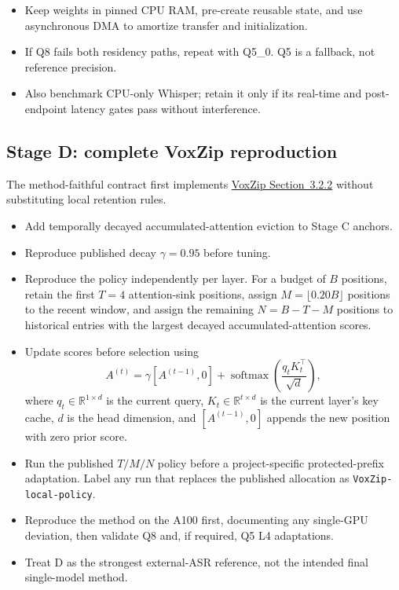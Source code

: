 \documentclass[10pt,letterpaper]{article}
\newcommand{\code}[1]{\texttt{#1}}
\begin{document}
\begin{itemize}
    \item Keep weights in pinned CPU RAM, pre-create reusable state, and use asynchronous DMA to amortize transfer and initialization.
    \item If Q8 fails both residency paths, repeat with Q5\_0. Q5 is a fallback, not reference precision.
    \item Also benchmark CPU-only Whisper; retain it only if its real-time and post-endpoint latency gates pass without interference.
\end{itemize}

\subsection{Stage D: complete VoxZip reproduction}
The method-faithful contract first implements
\href{https://arxiv.org/html/2608.08569#S3.SS2.SSS2}{VoxZip Section~3.2.2}
without substituting local retention rules.
\begin{itemize}
    \item Add temporally decayed accumulated-attention eviction to Stage C anchors.
    \item Reproduce published decay $\gamma=0.95$ before tuning.
    \item Reproduce the policy independently per layer. For a budget of $B$ positions, retain the first $T=4$ attention-sink positions, assign $M=\lfloor0.20B\rfloor$ positions to the recent window, and assign the remaining $N=B-T-M$ positions to historical entries with the largest decayed accumulated-attention scores.
    \item Update scores before selection using
    \[
    A^{(t)}=\gamma[A^{(t-1)},0]
    +\operatorname{softmax}\!\left(\frac{q_tK_t^\top}{\sqrt d}\right),
    \]
    where $q_t\in\mathbb R^{1\times d}$ is the current query, $K_t\in\mathbb R^{t\times d}$ is the current layer's key cache, $d$ is the head dimension, and $[A^{(t-1)},0]$ appends the new position with zero prior score.
    \item Run the published $T/M/N$ policy before a project-specific protected-prefix adaptation. Label any run that replaces the published allocation as \code{VoxZip-local-policy}.
    \item Reproduce the method on the A100 first, documenting any single-GPU deviation, then validate Q8 and, if required, Q5 L4 adaptations.
    \item Treat D as the strongest external-ASR reference, not the intended final single-model method.
\end{itemize}
\end{document}
